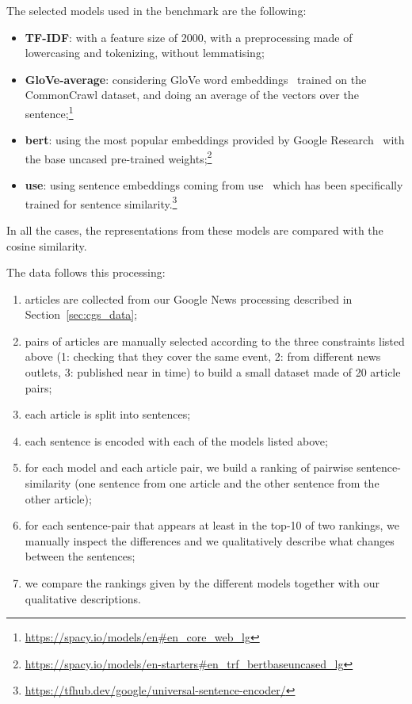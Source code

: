 The selected models used in the benchmark are the following:
\begin{itemize}
    \item \textbf{TF-IDF}: with a feature size of 2000, with a preprocessing made of lowercasing and tokenizing, without lemmatising;
    \item \textbf{GloVe-average}: considering GloVe word embeddings~\citep{pennington2014glove} trained on the CommonCrawl dataset, and doing an average of the vectors over the sentence;\footnote{\url{https://spacy.io/models/en\#en_core_web_lg}}
    \item \textbf{\acrshort{bert}}: using the most popular embeddings provided by Google Research~\citep{devlin2018bert} with the base uncased pre-trained weights;\footnote{\url{https://spacy.io/models/en-starters\#en_trf_bertbaseuncased_lg}}
    \item \textbf{\acrshort{use}}: using sentence embeddings coming from \acrfull{use}~\citep{cer2018universal} which has been specifically trained for sentence similarity.\footnote{\url{https://tfhub.dev/google/universal-sentence-encoder/}}
\end{itemize}

In all the cases, the representations from these models are compared with the cosine similarity.

The data follows this processing:

\begin{enumerate}
    \item articles are collected from our Google News processing described in Section~\ref{sec:cgs_data};
    \item pairs of articles are manually selected according to the three constraints listed above (1: checking that they cover the same event, 2: from different news outlets, 3: published near in time) to build a small dataset made of 20 article pairs;
    \item each article is split into sentences;
    \item each sentence is encoded with each of the models listed above;
    \item for each model and each article pair, we build a ranking of pairwise sentence-similarity (one sentence from one article and the other sentence from the other article);
    \item for each sentence-pair that appears at least in the top-10 of two rankings, we manually inspect the differences and we qualitatively describe what changes between the sentences;
    \item we compare the rankings given by the different models together with our qualitative descriptions.
\end{enumerate}



